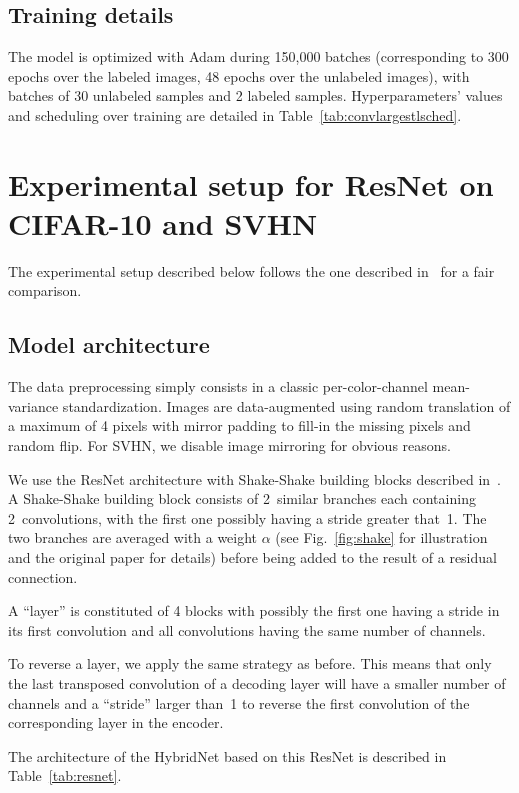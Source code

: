 \documentclass[runningheads]{llncs}
\begin{document}
\subsection{Training details}

The model is optimized with Adam during 150,000 batches (corresponding to 300 epochs over the labeled images, 48 epochs over the unlabeled images), with batches of 30 unlabeled samples and 2 labeled samples.
Hyperparameters' values and scheduling over training are detailed in Table~\ref{tab:convlargestlsched}.


\section{Experimental setup for ResNet on CIFAR-10 and SVHN}

The experimental setup described below follows the one described in~\cite{Tarvainen2017} for a fair comparison.

\subsection{Model architecture}

The data preprocessing simply consists in a classic per-color-channel mean-variance standardization. Images are data-augmented using random translation of a maximum of 4 pixels with mirror padding to fill-in the missing pixels and random flip. For SVHN, we disable image mirroring for obvious reasons.

We use the ResNet architecture with Shake-Shake building blocks described in~\cite{Gastaldi2017}. A Shake-Shake building block consists of 2~similar branches each containing 2~convolutions, with the first one possibly having a stride greater that~1. The two branches are averaged with a weight $\alpha$ (see Fig.~\ref{fig:shake} for illustration and the original paper for details) before being added to the result of a residual connection.

A ``layer'' is constituted of 4 blocks with possibly the first one having a stride in its first convolution and all convolutions having the same number of channels.

To reverse a layer, we apply the same strategy as before. This means that only the last transposed convolution of a decoding layer will have a smaller number of channels and a ``stride'' larger than~1 to reverse the first convolution of the corresponding layer in the encoder.

The architecture of the HybridNet based on this ResNet is described in Table~\ref{tab:resnet}.
\end{document}
